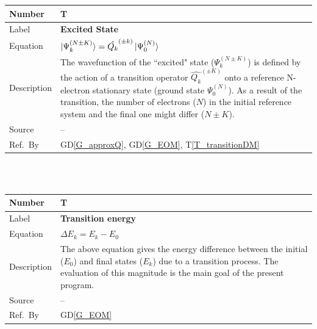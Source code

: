 \documentclass[12pt]{article}
\newcommand{\colAwidth}{0.13\textwidth}
\newcommand{\colBwidth}{0.82\textwidth}
\newcommand{\dref}[1]{GD\ref{#1}}
\newcounter{theorynum} %
\newcommand{\tref}[1]{T\ref{#1}}
\begin{document}
\noindent
\begin{minipage}{\textwidth}
	\renewcommand*{\arraystretch}{1.5}
	\begin{tabular}{| p{\colAwidth} | p{\colBwidth}|}
		\hline
		\rowcolor[gray]{0.9}
		Number& T{theorynum}\thetheorynum \label{T_ExcState}\\
		\hline
		Label&\bf Excited State\\
		\hline
		Equation&  $\ket{\Psi^{(N\pm K)}_k} = \hat{Q_k}^{(\pm 
			k)}\ket{\Psi^{(N)}_0}$ \\
		\hline
		Description & 
		The wavefunction of the ``excited" state ($\Psi^{(N\pm K)}_k$) is 
		defined by the action of a 
		transition operator $\hat{Q_k}^{(\pm K)}$ onto a reference N-electron 
		stationary 
		state (ground state $\Psi^{(N)}_0$). As a 
		result 
		of the transition,
the number of electrons ($N$) in the initial 
		reference system and the final one might differ ($N\pm K$).
\\
		\hline
		Source & --\\
		\hline
		Ref.\ By & \dref{G_approxQ}, \dref{G_EOM}, \tref{T_transitionDM}\\
		\hline
	\end{tabular}
\end{minipage}\\

~\newline

\noindent
\begin{minipage}{\textwidth}
	\renewcommand*{\arraystretch}{1.5}
	\begin{tabular}{| p{\colAwidth} | p{\colBwidth}|}
		\hline
		\rowcolor[gray]{0.9}
		Number& T{theorynum}\thetheorynum 
		\label{T_DeltaE}\\
		\hline
		Label&\bf Transition energy\\
		\hline
		Equation&  $\Delta E_k = E_k - E_0$ \\
		\hline
		Description & 
		The above equation gives the energy difference between the initial 
		($E_0$) and final states ($E_k$) due to a transition process. The 
		evaluation of this magnitude is the main goal of the present program.\\
		\hline
		Source & -- \\
		\hline
		Ref.\ By & \dref{G_EOM}\\
		\hline
	\end{tabular}
\end{minipage}\\
\end{document}
